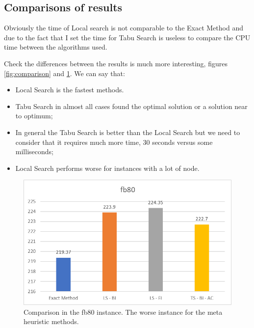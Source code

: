 
\subsection{Comparisons of results}

	Obviously the time of Local search is not comparable to the Exact Method and due to the fact that I set the time for Tabu Search is useless to compare the CPU time between the algorithms used.
	
	Check the differences between the results is much more interesting, figures \ref{fig:comparison} and \ref{fig:fb80-comparison}. We can say that:
	\begin{itemize}
		\item Local Search is the fastest methods.
		\item Tabu Search in almost all cases found the optimal solution or a solution near to optimum;
		\item In general the Tabu Search is better than the Local Search but we need to consider that it requires much more time, 30 seconds versus some milliseconds;
		\item Local Search performs worse for instances with a lot of node.
	\end{itemize}

	\vspace{2cm}
	
	\begin{figure}[bh]
		\centering
		\includegraphics[width=\linewidth]{img/fb80-comparison}
		\caption{Comparison in the fb80 instance. The worse instance for the meta heuristic methods.}
		\label{fig:fb80-comparison}
	\end{figure}
	
